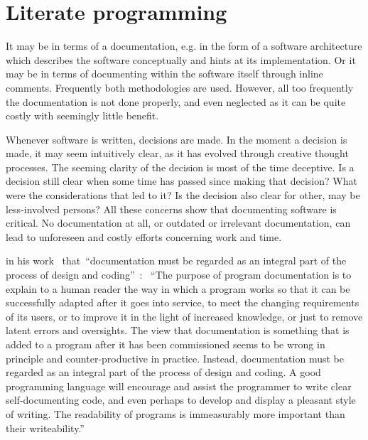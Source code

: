 \documentclass[%
    a4paper,    %
    justified,  %
    nobib,      %
    openany     %
]{tufte-book}
\makeatletter
\renewcommand{\label}[1]{\@tufte@label{##1}}%
\makeatother
\begin{document}
\section{Literate programming}
\label{sec:literate-programming}

 It may be in terms of
a documentation, e.g. in the form of a software architecture which
describes the software conceptually and hints at its implementation. Or it may
be in terms of documenting within the software itself through inline comments.
Frequently both methodologies are used. However, all too
frequently the documentation is not done properly, and even neglected as it can
be quite costly with seemingly little benefit.

 Whenever software is written,
decisions are made. In the moment a decision is made, it may seem intuitively
clear, as it has evolved through creative thought processes. The seeming clarity
of the decision is most of the time deceptive. Is a decision still clear when
some time has passed since making that decision? What were the considerations
that led to it? Is the decision also clear for other, may be less-involved
persons? All these concerns show that documenting software is critical. No
documentation at all, or outdated or irrelevant documentation, can lead to
unforeseen and costly efforts concerning work and time.

 in his
work~ that~\enquote{documentation must be regarded as
an integral part of the process of design and coding}~\cite[p.
195]{hoare-hpl-1973}: ~\enquote{The purpose of program documentation is to
explain to a human reader the way in which a program works so that it can be
successfully adapted after it goes into service, to meet the changing
requirements of its users, or to improve it in the light of increased knowledge,
or just to remove latent errors and oversights. The view that documentation is
something that is added to a program after it has been commissioned seems to be
wrong in principle and counter-productive in practice. Instead, documentation
must be regarded as an integral part of the process of design and coding. A good
programming language will encourage and assist the programmer to write clear
self-documenting code, and even perhaps to develop and display a pleasant style
of writing. The readability of programs is immeasurably more important than
their writeability.}~\cite[p. 195]{hoare-hpl-1973}
\end{document}

